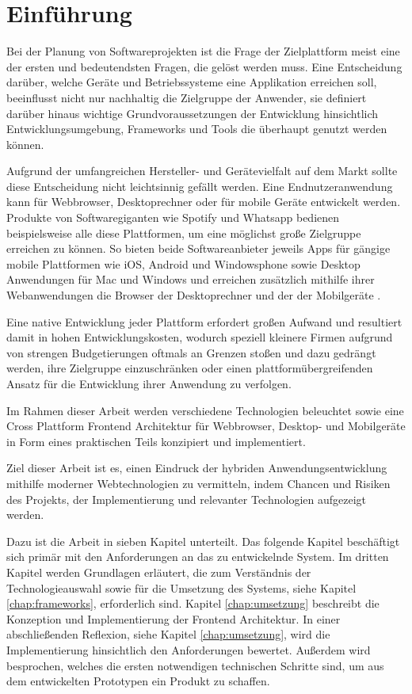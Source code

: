 
\chapter{Einführung}
\label{chap:introduction}

Bei der Planung von Softwareprojekten ist die Frage der Zielplattform meist eine der ersten und bedeutendsten Fragen,
die gelöst werden muss. Eine Entscheidung darüber, welche Geräte und Betriebssysteme eine Applikation erreichen soll,
beeinflusst nicht nur nachhaltig die Zielgruppe der Anwender, sie definiert darüber hinaus wichtige Grundvoraussetzungen der Entwicklung hinsichtlich Entwicklungsumgebung, Frameworks und Tools die überhaupt genutzt werden können.

Aufgrund der umfangreichen Hersteller- und Gerätevielfalt auf dem Markt sollte diese Entscheidung nicht leichtsinnig gefällt werden.
Eine Endnutzeranwendung kann für Webbrowser, Desktoprechner oder für mobile Geräte entwickelt werden.
Produkte von Softwaregiganten wie Spotify und Whatsapp bedienen beispielsweise alle diese Plattformen, um eine möglichst große Zielgruppe erreichen zu können.
So bieten beide Softwareanbieter jeweils Apps für gängige mobile Plattformen wie iOS, Android und Windowsphone
sowie Desktop Anwendungen für Mac und Windows und erreichen zusätzlich mithilfe ihrer Webanwendungen die Browser der Desktoprechner
und der der Mobilgeräte \cite{Spoti93:online} \cite{Whats74:online} \cite{Whats6:online}.

Eine native Entwicklung jeder Plattform erfordert großen Aufwand und resultiert damit in hohen
Entwicklungskosten, wodurch speziell kleinere Firmen aufgrund von strengen Budgetierungen oftmals
an Grenzen stoßen und
dazu gedrängt werden, ihre Zielgruppe einzuschränken oder einen plattformübergreifenden Ansatz für
die Entwicklung ihrer Anwendung zu verfolgen.

Im Rahmen dieser Arbeit werden verschiedene Technologien beleuchtet sowie eine
Cross Plattform Frontend Architektur für Webbrowser, Desktop- und Mobilgeräte in Form eines praktischen Teils
konzipiert und implementiert.

Ziel dieser Arbeit ist es, einen Eindruck der hybriden Anwendungsentwicklung mithilfe moderner
Webtechnologien zu vermitteln, indem Chancen und Risiken des Projekts, der Implementierung und relevanter Technologien aufgezeigt werden.

\vspace{0.6cm}

\noindent
Dazu ist die Arbeit in sieben Kapitel unterteilt. Das folgende Kapitel beschäftigt sich primär mit den
Anforderungen an das zu entwickelnde System.
Im dritten Kapitel werden Grundlagen erläutert, die zum Verständnis der Technologieauswahl
sowie für die Umsetzung des Systems, siehe Kapitel \ref{chap:frameworks}, erforderlich sind.
Kapitel \ref{chap:umsetzung} beschreibt die Konzeption und Implementierung der Frontend Architektur.
In einer abschließenden Reflexion, siehe Kapitel \ref{chap:umsetzung}, wird die Implementierung hinsichtlich den Anforderungen bewertet.
Außerdem wird besprochen, welches die ersten notwendigen technischen Schritte sind, um aus dem entwickelten Prototypen ein Produkt zu schaffen.
